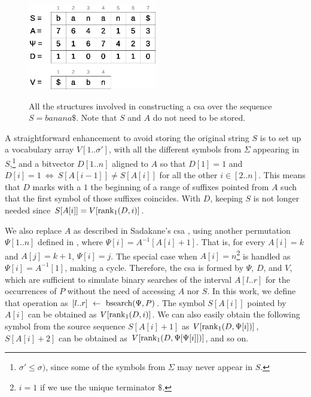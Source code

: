 \documentclass[a4paper,10pt,twoside]{book}
\begin{document}
    \begin{figure}[ht]
		\begin{center}
			{\includegraphics[width=0.5\textwidth]{figures/csa.eps}}
		\end{center}
		\caption{All the structures involved in constructing a \acrlong{csa} over the sequence $S = banana\$$. Note that $S$ and $A$ do not need to be stored.}
		\label{fig:csa}
	\end{figure}
    
    A straightforward enhancement to avoid storing the original string $S$ is to set up a vocabulary array $V[1..\sigma']$, with all the different symbols from $\Sigma$ appearing in $S$,\footnote{$\sigma' \leq \sigma)$, since some of the symbols from $\Sigma$ may never appear in $S$.} and a bitvector $D[1..n]$ aligned to $A$ so that $D[1]=1$ and $D[i]=1~\iff~S[A[i-1]] \neq S[A[i]]$ for all the other $i \in [2..n]$. This means that $D$ marks with a $1$ the beginning of a range of suffixes pointed from $A$ such that the first symbol of those suffixes coincides. With $D$, keeping $S$ is not longer needed since $S[A[i]] = V[\operatorname{rank}_1(D,i)]$.
    
    We also replace $A$ as described in Sadakane's \gls{csa} \cite{Sad03}, using
    another permutation $\Psi[1..n]$ defined in \cite{GV00}, where $\Psi[i] = A^{-1}[A[i]+1]$. That is, for every $A[i]=k$ and $A[j]=k+1$, $\Psi[i]=j$.
    The special case when $A[i]=n$\footnote{$i=1$ if we use the unique terminator $\$$.} is handled as $\Psi[i]=A^{-1}[1]$, making a cycle.
    Therefore, the \gls{csa} is formed by $\Psi$, $D$, and $V$, which are sufficient to simulate binary searches of the interval $A[l..r]$ for the occurrences of $P$ without the need of accessing $A$ nor $S$. In this work, we define that operation as $[l..r]~\leftarrow~\operatorname{bsearch}(\Psi,P)$.
    The symbol $S[A[i]]$ pointed by $A[i]$ can be obtained as
    $V[\operatorname{rank}_1(D,i)]$. We can also easily obtain the following symbol from the source sequence  $S[A[i]+1]$ as
    $V[\operatorname{rank}_1(D, \Psi[i])]$, $S[A[i]+2]$ can be obtained as $V[\operatorname{rank}_1(D, \Psi[\Psi[i]])]$, and so on.
    
\end{document}
